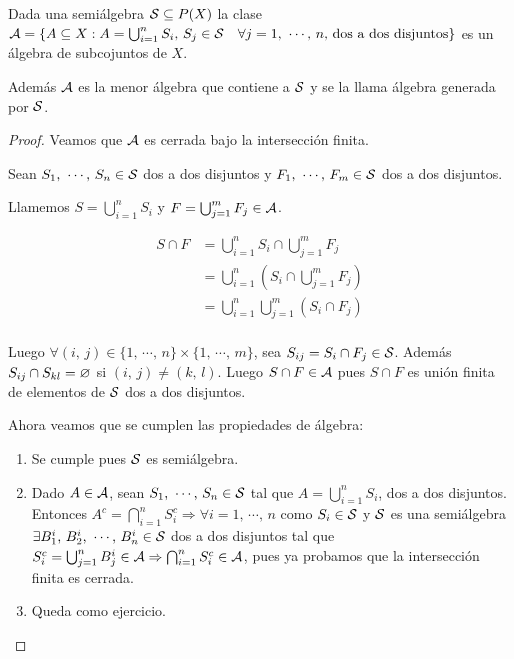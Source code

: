 \begin{lemma}
    Dada una semiálgebra $\mathcal{S} \subseteq P(X)$ la clase $\mathcal{A} = \{ A \subseteq X : A = \bigcup_{i = 1}^n S_i \text{, } S_j \in \mathcal{S} \quad \forall j = 1 \text{, }\cdots \text{, } n \text{, dos a dos disjuntos} \}$
    es un álgebra de subcojuntos de $X$.

    Además $\mathcal{A}$ es la menor álgebra que contiene a $\mathcal{S}$ y se la llama álgebra generada por $\mathcal{S}$.

    \begin{proof}
        Veamos que $\mathcal{A}$ es cerrada bajo la intersección finita.

        Sean $S_1 \text{, } \cdots \text{, } S_n \in \mathcal{S}$ dos a dos disjuntos y $F_1 \text{, } \cdots \text{, } F_m \in \mathcal{S}$ dos a dos disjuntos.

        Llamemos $S = \bigcup_{i = 1}^n S_i$ y $F = \bigcup_{j = 1}^m F_j \in \mathcal{A}$.

        \begin{align*}
            S \cap F & = \bigcup_{i = 1}^n S_i \cap \bigcup_{j = 1}^m F_j   \\
                     & = \bigcup_{i = 1}^n (S_i \cap \bigcup_{j = 1}^m F_j) \\
                     & = \bigcup_{i = 1}^n \bigcup_{j = 1}^m (S_i \cap F_j) \\
        \end{align*}

        Luego $\forall (i\text{, } j) \in \{ 1 \text{, } \cdots \text{, } n \} \times \{ 1 \text{, } \cdots \text{, } m\}$, sea $S_{ij} = S_i \cap F_j \in \mathcal{S}$.
        Además $S_{ij} \cap S_{kl} = \varnothing$ si $(i\text{, } j) \neq (k \text{, } l)$.
        Luego $S \cap F \in \mathcal{A}$ pues $S \cap F$ es unión finita de elementos de $\mathcal{S}$ dos a dos disjuntos.

        Ahora veamos que se cumplen las propiedades de álgebra:
        \begin{enumerate}
            \item Se cumple pues $\mathcal{S}$ es semiálgebra.
            \item Dado $A \in \mathcal{A}$, sean $S_1 \text{, } \cdots \text{, } S_n \in \mathcal{S}$ tal que $A = \bigcup_{i = 1}^n S_i$, dos a dos disjuntos. Entonces
                  $A^c = \bigcap_{i = 1}^n S_i^c \Rightarrow \forall i = 1 \text{, } \cdots \text{, } n$ como $S_i \in \mathcal{S}$ y $\mathcal{S}$ es una semiálgebra $\exists B_1^i \text{, } B_2^i \text{, } \cdots \text{, } B_n^i \in \mathcal{S}$ dos a dos disjuntos
                  tal que $S_i^c = \bigcup_{j = 1}^n B_j^i \in \mathcal{A} \Rightarrow \bigcap_{i = 1}^n S_i^c \in \mathcal{A}$, pues ya probamos que la intersección finita es cerrada.
            \item Queda como ejercicio.
        \end{enumerate}
    \end{proof}
\end{lemma}